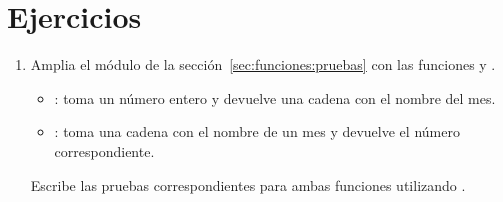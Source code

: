 \section{Ejercicios}

\begin{enumerate}

\item Amplia el módulo  de la sección~\ref{sec:funciones:pruebas}
      con las funciones  y .
  \begin{itemize}
    \item {}: toma un número entero y
      devuelve una cadena con el nombre del mes. 
    \item {}: toma una cadena con el nombre
      de un mes y devuelve el número correspondiente.
  \end{itemize}

  Escribe las pruebas correspondientes para ambas funciones 
  utilizando .

\end{enumerate}
